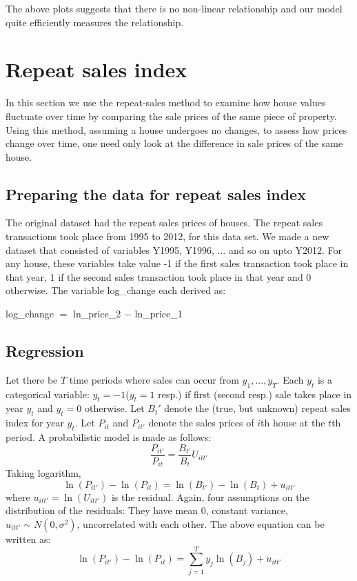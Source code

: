 \documentclass[12pt]{article}
\begin{document}
The above plots suggests that there is no non-linear relationship and our model quite efficiently measures the relationship.

\section{Repeat sales index}
\label{rsi}
In this section we use the repeat-sales method to examine how house values fluctuate over time by comparing the sale prices of the same piece of property.
Using this method, assuming a house undergoes no changes, to assess how prices change over
time, one need only look at the difference in sale prices of the same house.
\subsection{Preparing the data for repeat sales index}
The original dataset had the repeat sales prices of houses. The repeat sales transactions took place from 1995 to 2012, for this data set. We made a new dataset that consisted of variables Y1995, Y1996, ... and so on upto Y2012. For any house, these variables take value -1 if the first sales transaction took place in that year, 1 if the second sales transaction took place in that year and 0 otherwise. The variable log\_change each derived as:
\begin{center}
    log\_change $=$ ln\_price\_2 $-$ ln\_price\_1
\end{center}
\subsection{Regression}
Let there be $T$ time periods where sales can occur from $y_1, ..., y_T$. Each $y_t$ is a categorical variable: $y_t=-1$($y_t=1$ resp.) if first (second resp.) sale takes place in year $y_t$ and $y_t=0$ otherwise. Let $B_{t}'$ denote the (true, but unknown) repeat sales index for year $y_t$. Let $P_{it}$ and $P_{it'}$ denote the sales prices of $i$th house at the $t$th period. A probabilistic model is made as follows:
$$\frac{P_{it'}}{P_{it}}=\frac{B_{t'}}{B_{t}}U_{itt'}$$
Taking logarithm, 
$$\ln(P_{it'})-\ln(P_{it})=\ln(B_{t'})-\ln(B_{t})+u_{itt'} $$
where $u_{itt'}=\ln(U_{itt'})$ is the residual. Again, four assumptions on the distribution of the residuals: They have mean 0, constant variance, $u_{itt'}\sim N(0, \sigma^2)$, uncorrelated with each other.  The above equation can be written as:
$$\ln(P_{it'})-\ln(P_{it})=\sum_{j=1} ^{T}{y_j \ln(B_{j})} +u_{itt'} $$
\end{document}
